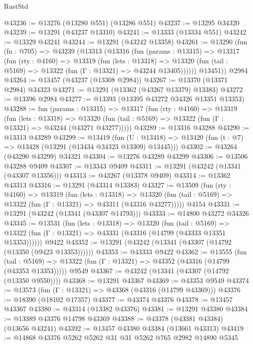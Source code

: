 \begin{lexlean}{RustStd}
\begin{coremodule}
@43236 := @13276 (@13280 @551) (@13286 @551)
@43237 := @13295 @34320
@43239 := @13291 (@43237 @13310)
@43241 := @13333 (@13334 @551)
@43242 := @13329 @43241
@43244 := @13291 (@43242 @13358)
@43261 := @13290
    (fun (fn : @705) =>
    @43239
      (@13313
        (@13316
          (fun (params : @13315) =>
          @13317
            (fun (rty : @4160) =>
            @13319
              (fun (lets : @13318) =>
              @13320 (fun (tail : @5169) => @13322 (fun (Γ : @13321) => @43244 @13405))))))
        @13451))
    @2984
@43264 := @13457 (@43237 (@13308 @2984))
@43267 := @13370 (@13371 @2984) @34323
@43271 := @13291 (@13362 (@43267 @13379) @13383)
@43272 := @13396 @2984
@43277 := @13393 (@13395 @43272 @34326 @13351 @13353)
@43288 := fun (params : @13315) =>
  @13317
    (fun (rty : @4160) =>
    @13319
      (fun (lets : @13318) =>
      @13320 (fun (tail : @5169) => @13322 (fun (Γ : @13321) => @43244 (@43271 @43277)))))
@43289 := @13316 @43288
@43290 := @13313 @43289
@43299 := @13419
    (fun (U : @13418) => @13420 (fun (t : @7) => @13428 (@13291 (@13434 @34323 @13309) @13445)))
@43302 := @43264 (@43290 @43299) @34321
@43304 := @13276 @43289 @43299
@43306 := @13506 @43288 @9409
@43307 := @13343 @9409
@43311 := @13291 (@43242 (@13341 (@43307 @13356)))
@43313 := @43267 (@13378 @9409)
@43314 := @13362 @43313
@43316 := @13291 (@43314 @13383)
@43327 := @13509
    (fun (rty : @4160) =>
    @13319
      (fun (lets : @13318) =>
      @13320 (fun (tail : @5169) => @13322 (fun (Γ : @13321) => @43311 (@43316 @43277)))))
    @4154
@43331 := @13291 (@43242 (@13341 (@43307 @14793)))
@43333 := @14800 @43272 @34326
@43345 := @13531
    (fun (lets : @13318) =>
    @13320
      (fun (tail : @5169) =>
      @13322 (fun (Γ : @13321) => @43331 (@43316 (@14799 (@43333 @13351 @13353))))))
    @9422
@43352 := @13291 (@43242 (@13341 (@43307 (@14792 (@13350 (@9423 @13353))))))
@43353 := @43333 @9422
@43362 := @13555
    (fun (tail : @5169) => @13322 (fun (Γ : @13321) => @43352 (@43316 (@14799 (@43353 @13353)))))
    @9549
@43367 := @43242 (@13341 (@43307 (@14792 (@13350 @9550))))
@43368 := @13291 @43367
@43369 := @43353 @9549
@43374 := @13573 (fun (Γ : @13321) => @43368 (@43316 (@14799 @43369)))
@43376 := @18390 (@18102 @17357)
@43377 := @43374 @43376
@43378 := @13457 @43367
@43380 := @43314 (@13382 @43376)
@43381 := @13291 @43380
@43384 := @13389 @43376 @14798 @43369
@43388 := @43378 (@43381 @43384) (@13656 @43241)
@43392 := @13457 @43380 @43384 (@13661 @43313)
@43419 := @14868
    @43376
    @5262
    @5262
    @31
    @31
    @5262
    @765
    @2982
    @14890
    @5345

\end{coremodule}
\end{lexlean}
